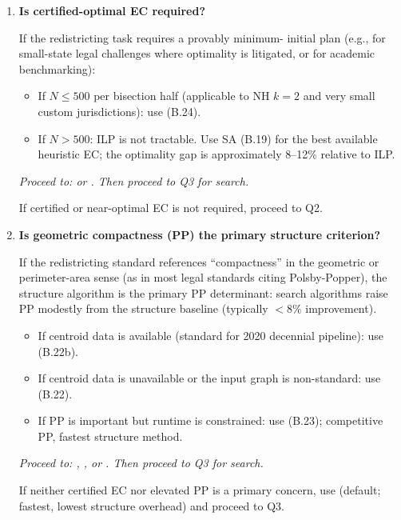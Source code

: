 \begin{enumerate}[label=\textbf{Q\arabic*.}]

  \item \textbf{Is certified-optimal EC required?}

        If the redistricting task requires a provably minimum-\ec{} initial
        plan (e.g., for small-state legal challenges where optimality is
        litigated, or for academic benchmarking):

        \begin{itemize}
          \item If $N \leq 500$ per bisection half (applicable to NH $k = 2$
                and very small custom jurisdictions): use \ilp{} (B.24).
          \item If $N > 500$: ILP is not tractable. Use SA (B.19) for the
                best available heuristic EC; the optimality gap is
                approximately 8--12\% relative to ILP.
        \end{itemize}

        \emph{Proceed to: \ilp{} or \sa{}. Then proceed to Q3 for search.}

        If certified or near-optimal EC is not required, proceed to Q2.

  \item \textbf{Is geometric compactness (PP) the primary structure
        criterion?}

        If the redistricting standard references ``compactness'' in the
        geometric or perimeter-area sense (as in most legal standards citing
        Polsby-Popper), the structure algorithm is the primary PP determinant:
        search algorithms raise PP modestly from the structure baseline
        (typically $< 8\%$ improvement).

        \begin{itemize}
          \item If centroid data is available (standard for 2020 decennial
                pipeline): use \cvdgeo{} (B.22b).
          \item If centroid data is unavailable or the input graph is
                non-standard: use \cvdg{} (B.22).
          \item If PP is important but runtime is constrained: use
                \bfsgrow{} (B.23); competitive PP, fastest structure method.
        \end{itemize}

        \emph{Proceed to: \cvdgeo{}, \cvdg{}, or \bfsgrow{}.
        Then proceed to Q3 for search.}

        If neither certified EC nor elevated PP is a primary concern,
        use \metis{} (default; fastest, lowest structure overhead)
        and proceed to Q3.

\end{enumerate}

